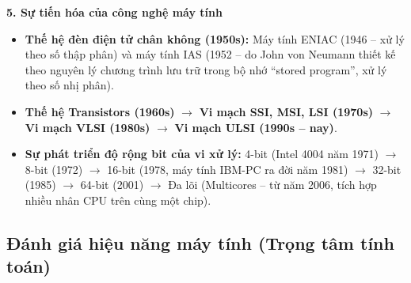 \textbf{5. Sự tiến hóa của công nghệ máy tính}
\begin{itemize}
    \item \textbf{Thế hệ đèn điện tử chân không (1950s):} Máy tính ENIAC (1946 -- xử lý theo số thập phân) và máy tính IAS (1952 -- do John von Neumann thiết kế theo nguyên lý chương trình lưu trữ trong bộ nhớ ``stored program'', xử lý theo số nhị phân).
    \item \textbf{Thế hệ Transistors (1960s)} $\rightarrow$ \textbf{Vi mạch SSI, MSI, LSI (1970s)} $\rightarrow$ \textbf{Vi mạch VLSI (1980s)} $\rightarrow$ \textbf{Vi mạch ULSI (1990s -- nay)}.
    \item \textbf{Sự phát triển độ rộng bit của vi xử lý:} 4-bit (Intel 4004 năm 1971) $\rightarrow$ 8-bit (1972) $\rightarrow$ 16-bit (1978, máy tính IBM-PC ra đời năm 1981) $\rightarrow$ 32-bit (1985) $\rightarrow$ 64-bit (2001) $\rightarrow$ Đa lõi (Multicores -- từ năm 2006, tích hợp nhiều nhân CPU trên cùng một chip).
\end{itemize}

\subsection{Đánh giá hiệu năng máy tính (Trọng tâm tính toán)}

